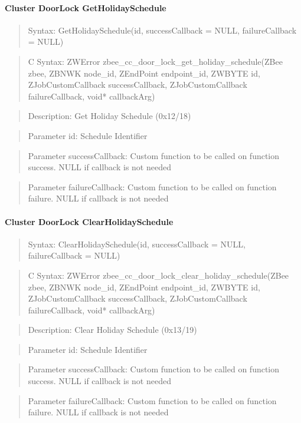 \paragraph{Cluster DoorLock GetHolidaySchedule}
\begin{quote}Syntax: GetHolidaySchedule(id, successCallback = NULL, failureCallback = NULL)\end{quote}
\begin{quote}C Syntax: ZWError zbee\_cc\_door\_lock\_get\_holiday\_schedule(ZBee zbee, ZBNWK node\_id, ZEndPoint endpoint\_id, ZWBYTE id, ZJobCustomCallback successCallback, ZJobCustomCallback failureCallback, void* callbackArg)\end{quote}
\begin{quote}Description: Get Holiday Schedule (0x12/18)\end{quote}
\begin{quote}Parameter id: Schedule Identifier\end{quote}
\begin{quote}Parameter successCallback: Custom function to be called on function success. NULL if callback is not needed\end{quote}
\begin{quote}Parameter failureCallback: Custom function to be called on function failure. NULL if callback is not needed\end{quote}


\paragraph{Cluster DoorLock ClearHolidaySchedule}
\begin{quote}Syntax: ClearHolidaySchedule(id, successCallback = NULL, failureCallback = NULL)\end{quote}
\begin{quote}C Syntax: ZWError zbee\_cc\_door\_lock\_clear\_holiday\_schedule(ZBee zbee, ZBNWK node\_id, ZEndPoint endpoint\_id, ZWBYTE id, ZJobCustomCallback successCallback, ZJobCustomCallback failureCallback, void* callbackArg)\end{quote}
\begin{quote}Description: Clear Holiday Schedule (0x13/19)\end{quote}
\begin{quote}Parameter id: Schedule Identifier\end{quote}
\begin{quote}Parameter successCallback: Custom function to be called on function success. NULL if callback is not needed\end{quote}
\begin{quote}Parameter failureCallback: Custom function to be called on function failure. NULL if callback is not needed\end{quote}


